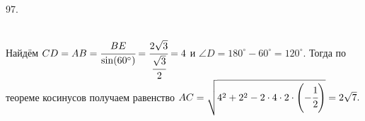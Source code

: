 97. \begin{figure}[ht!]
\end{figure}\\
Найдём $CD=AB=\cfrac{BE}{\sin(60^\circ)}=\cfrac{2\sqrt{3}}{\cfrac{\sqrt{3}}{2}}=4$ и $\angle D=180^\circ-60^\circ=120^\circ.$ Тогда по теореме косинусов получаем равенство $AC=\sqrt{4^2+2^2-2\cdot4\cdot2\cdot\left(-\cfrac{1}{2}\right)}=2\sqrt{7}.$\\
